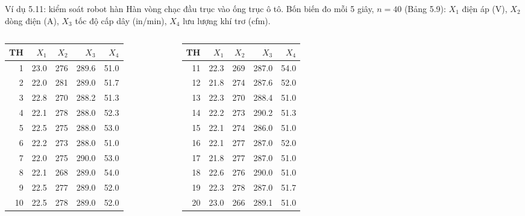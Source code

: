 \begin{frame}{Ví dụ 5.11: kiểm soát robot hàn}
  Hàn vòng chạc đầu trục vào ống trục ô tô. Bốn biến đo mỗi 5 giây, \(n=40\) (Bảng 5.9):
  \(X_1\) điện áp (V), \(X_2\) dòng điện (A), \(X_3\) tốc độ cấp dây (in/min), \(X_4\) lưu lượng khí trơ (cfm).

  \smallskip
  {\tiny\setlength{\tabcolsep}{2.5pt}
  \begin{columns}[T]
    \centering
    \begin{tabular}{rrrrr}
    \toprule
    TH & \(X_1\) & \(X_2\) & \(X_3\) & \(X_4\) \\
    \midrule
1 & 23.0 & 276 & 289.6 & 51.0 \\
2 & 22.0 & 281 & 289.0 & 51.7 \\
3 & 22.8 & 270 & 288.2 & 51.3 \\
4 & 22.1 & 278 & 288.0 & 52.3 \\
5 & 22.5 & 275 & 288.0 & 53.0 \\
6 & 22.2 & 273 & 288.0 & 51.0 \\
7 & 22.0 & 275 & 290.0 & 53.0 \\
8 & 22.1 & 268 & 289.0 & 54.0 \\
9 & 22.5 & 277 & 289.0 & 52.0 \\
10 & 22.5 & 278 & 289.0 & 52.0 \\
    \bottomrule
    \end{tabular}
    \centering
    \begin{tabular}{rrrrr}
    \toprule
    TH & \(X_1\) & \(X_2\) & \(X_3\) & \(X_4\) \\
    \midrule
11 & 22.3 & 269 & 287.0 & 54.0 \\
12 & 21.8 & 274 & 287.6 & 52.0 \\
13 & 22.3 & 270 & 288.4 & 51.0 \\
14 & 22.2 & 273 & 290.2 & 51.3 \\
15 & 22.1 & 274 & 286.0 & 51.0 \\
16 & 22.1 & 277 & 287.0 & 52.0 \\
17 & 21.8 & 277 & 287.0 & 51.0 \\
18 & 22.6 & 276 & 290.0 & 51.0 \\
19 & 22.3 & 278 & 287.0 & 51.7 \\
20 & 23.0 & 266 & 289.1 & 51.0 \\
    \bottomrule
    \end{tabular}
    \centering
    \begin{tabular}{rrrrr}

\end{tabular}
\end{columns}}
\end{frame}
